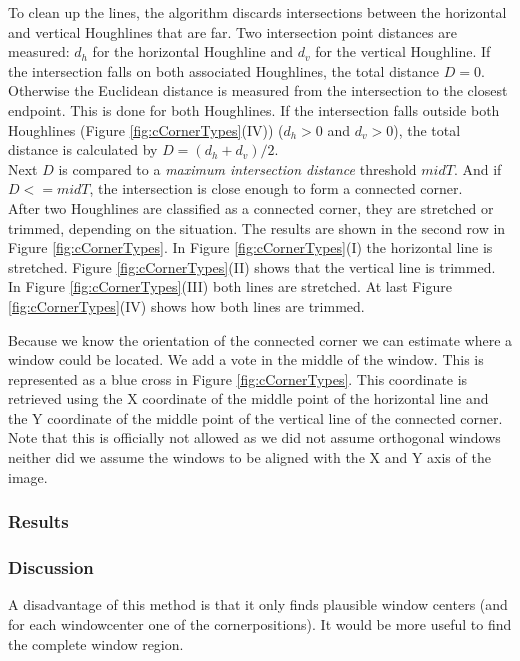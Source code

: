 To clean up the lines, the algorithm discards intersections between the
horizontal and vertical Houghlines that are far. 
Two intersection point distances are measured: $d_h$ for the horizontal Houghline and $d_v$
for the vertical Houghline.  If the intersection falls on both associated Houghlines,
	the total distance $D=0$.  Otherwise the Euclidean distance is measured from the
	intersection to the closest endpoint. This is done for both Houghlines.  If
	the intersection falls outside both Houghlines (Figure
	\ref{fig:cCornerTypes}(IV)) ($d_h>0$ and $d_v>0$), the total
	distance is calculated by $D=(d_h + d_v)/2$.\\
	Next $D$ is compared to
	a \emph{maximum intersection distance} threshold $midT$.  And if $D<=midT$,
	the intersection is close enough to form a connected corner.\\

After two Houghlines are classified as a connected corner, they are stretched or
trimmed, depending on the situation. The results are shown in the second row in
Figure \ref{fig:cCornerTypes}.
In Figure \ref{fig:cCornerTypes}(I)  the horizontal line is stretched.  Figure
\ref{fig:cCornerTypes}(II) shows that the vertical line is trimmed.  In Figure
\ref{fig:cCornerTypes}(III) both lines are stretched.  At last Figure
\ref{fig:cCornerTypes}(IV) shows how both lines are trimmed.


Because we know the orientation of the connected corner we can estimate where
a window could be located.  We add a vote in the middle of the window. 
This is represented as a blue cross in Figure \ref{fig:cCornerTypes}.
This coordinate is retrieved using the X coordinate of the middle point of the horizontal line
and the Y coordinate of the middle point of the vertical line of the connected corner.  
Note that this is officially not allowed as we did not assume orthogonal windows
neither did we assume the windows to be aligned with the X and Y axis of the
image.  

\subsubsection{Results}

\subsubsection{Discussion}
A disadvantage of this method is that it only finds plausible window centers
(and for each windowcenter one of the cornerpositions).  It would be more
useful to find the complete window region. 

